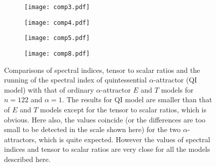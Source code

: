 \documentclass[a4paper,11pt]{article}
\begin{document}
 \begin{figure}[H]
\begin{subfigure}{0.52\linewidth}
  \centering
   \texttt{[image: comp3.pdf]} 
   \subcaption{}
   \label{fig:Comp3}
\end{subfigure}%
\begin{subfigure}{0.52\linewidth}
  \centering
   \texttt{[image: comp4.pdf]}
   \subcaption{}
   \label{fig:Comp4}
\end{subfigure}%
\vspace{0.1\linewidth}
\begin{subfigure}{0.52\linewidth}
  \centering
   \texttt{[image: comp5.pdf]}
   \subcaption{}
    \label{fig:Comp5}
\end{subfigure}%
\begin{subfigure}{0.52\linewidth}
  \centering
   \texttt{[image: comp8.pdf]}
   \subcaption{}
    \label{fig:Comp8}
\end{subfigure}
\caption{Comparisons of spectral indices, tensor to scalar ratios and the running of the spectral index of quintessential $\alpha$-attractor (QI model) with that of ordinary $\alpha$-attractor $E$ and $T$ models for $n=122$ and $\alpha=1$. The results for QI model are smaller than that of $E$ and $T$ models except for the tensor to scalar ratios, which is obvious. Here also, the values coincide (or the differences are too small to be detected in the scale shown here) for the two $\alpha$-attractors, which is quite expected. However the values of spectral indices and tensor to scalar ratios are very close for all the models described here.}
\label{fig:CompAlphaData2}
\end{figure}
\end{document}
